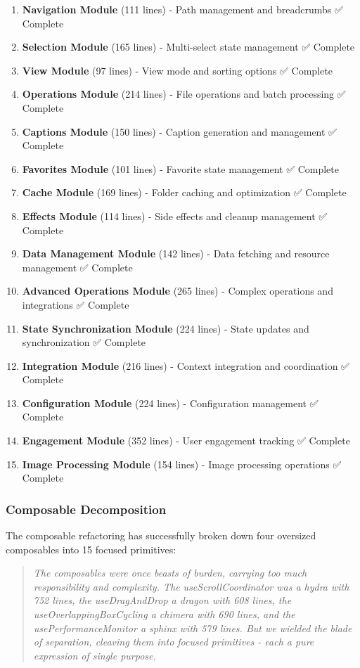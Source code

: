 \documentclass[11pt]{article}
\begin{document}
\begin{enumerate}
\item \textbf{Navigation Module} (111 lines) - Path management and breadcrumbs ✅ Complete
\item \textbf{Selection Module} (165 lines) - Multi-select state management ✅ Complete
\item \textbf{View Module} (97 lines) - View mode and sorting options ✅ Complete
\item \textbf{Operations Module} (214 lines) - File operations and batch processing ✅ Complete
\item \textbf{Captions Module} (150 lines) - Caption generation and management ✅ Complete
\item \textbf{Favorites Module} (101 lines) - Favorite state management ✅ Complete
\item \textbf{Cache Module} (169 lines) - Folder caching and optimization ✅ Complete
\item \textbf{Effects Module} (114 lines) - Side effects and cleanup management ✅ Complete
\item \textbf{Data Management Module} (142 lines) - Data fetching and resource management ✅ Complete
\item \textbf{Advanced Operations Module} (265 lines) - Complex operations and integrations ✅ Complete
\item \textbf{State Synchronization Module} (224 lines) - State updates and synchronization ✅ Complete
\item \textbf{Integration Module} (216 lines) - Context integration and coordination ✅ Complete
\item \textbf{Configuration Module} (224 lines) - Configuration management ✅ Complete
\item \textbf{Engagement Module} (352 lines) - User engagement tracking ✅ Complete
\item \textbf{Image Processing Module} (154 lines) - Image processing operations ✅ Complete
\end{enumerate}

\subsubsection{Composable Decomposition}

The composable refactoring has successfully broken down four oversized composables into 15 focused primitives:

\begin{quote}
\emph{The composables were once beasts of burden, carrying too much responsibility and complexity. The useScrollCoordinator was a hydra with 752 lines, the useDragAndDrop a dragon with 608 lines, the useOverlappingBoxCycling a chimera with 690 lines, and the usePerformanceMonitor a sphinx with 579 lines. But we wielded the blade of separation, cleaving them into focused primitives - each a pure expression of single purpose.}
\end{quote}
\end{document}
